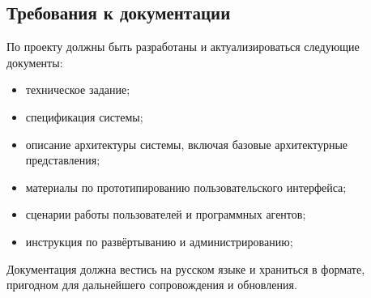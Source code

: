 \textheadingsep
\subsection{Требования к документации}

\headingtextsep

По проекту должны быть разработаны и актуализироваться следующие документы:

\begin{itemize}
    \item техническое задание;
    \item спецификация системы;
    \item описание архитектуры системы, включая базовые архитектурные представления;
    \item материалы по прототипированию пользовательского интерфейса;
    \item сценарии работы пользователей и программных агентов;
    \item инструкция по развёртыванию и администрированию;
\end{itemize}

Документация должна вестись на русском языке и храниться в формате, пригодном для дальнейшего сопровождения и обновления.